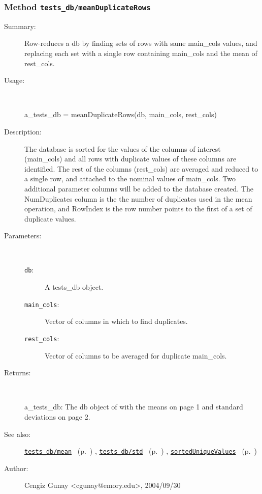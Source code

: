 \subsubsection[Method \texttt{meanDuplicateRows}]{Method \texttt{tests\_db/meanDuplicateRows}}%
%
\label{ref_tests_db__meanDuplicateRows}%
\hypertarget{ref_tests_db__meanDuplicateRows}{}%
\begin{description}
\item[Summary:]Row-reduces a db by finding sets of rows with same main\_cols values, and replacing each set with a single row containing main\_cols and the mean of rest\_cols.
%
\item[Usage:]~%
\begin{lyxcode}%
a\_tests\_db = meanDuplicateRows(db, main\_cols, rest\_cols)
%
\end{lyxcode}%
%
\item[Description:]%
The database is sorted for the values of the columns of 
 interest (main\_cols) and all rows with duplicate values of 
 these columns are identified. The rest of the columns (rest\_cols) 
 are averaged and reduced to a single row, and attached to the
 nominal values of main\_cols. Two additional parameter columns will be added to the
 database created. The NumDuplicates column is the the number of duplicates 
 used in the mean operation, and RowIndex is the row number points 
 to the first of a set of duplicate values.
\item[Parameters:]~
\begin{description}%
\item[\texttt{db}:]
 A tests\_db object.
\item[\texttt{main\_cols}:]
 Vector of columns in which to find duplicates.
\item[\texttt{rest\_cols}:]
 Vector of columns to be averaged for duplicate main\_cols.
\end{description}%
%
\item[Returns:]~

	a\_tests\_db: The db object of with the means on page 1 
		    and standard deviations on page 2.
%
%
\item[See also:]%
\hyperlink{ref_tests_db__mean}{\texttt{tests\_db/mean}}%
\ (p.~\pageref{ref_tests_db__mean})%
%
, \hyperlink{ref_tests_db__std}{\texttt{tests\_db/std}}%
\ (p.~\pageref{ref_tests_db__std})%
%
, \hyperlink{ref_sortedUniqueValues}{\texttt{sortedUniqueValues}}%
\ (p.~\pageref{ref_sortedUniqueValues})%
%
%
\item[Author:]%
Cengiz Gunay <cgunay@emory.edu>, 2004/09/30%
\end{description}
\methodline%
